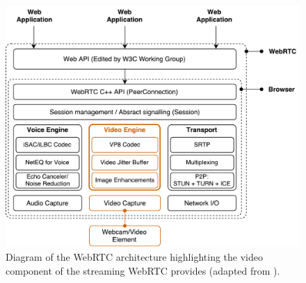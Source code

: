       \begin{figure}[h!]
        \centering
        \includegraphics[width=0.8\linewidth]{figures/softDesign-webRTCArch}
        \caption[Diagram of the WebRTC architecture highlighting the video component of the streaming WebRTC provides.]{Diagram of the WebRTC architecture highlighting the video component of the streaming WebRTC provides (adapted from \cite{fig:softDesign-webRTCArch_cite}).}
        \label{fig:softDesign-webRTCArch}
      \end{figure}
      
